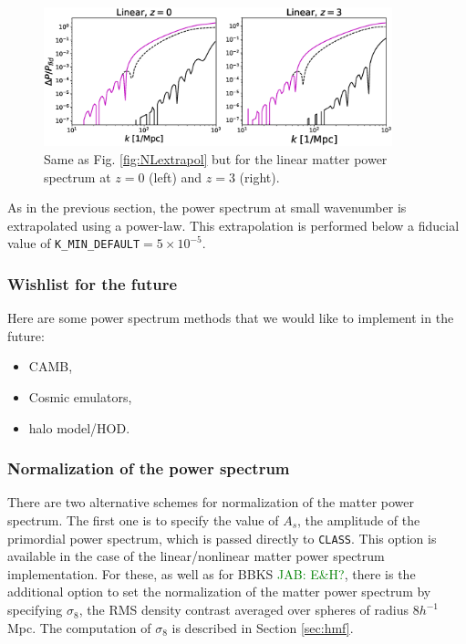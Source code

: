 \documentclass[\docopts]{\docclass}
\newcommand{\jab}[1]{\textcolor{green}{JAB: #1}}
\begin{document}
\begin{figure}
\centering
\includegraphics[width=0.9\textwidth]{PS_converge_lin.eps}
\caption{Same as Fig. \ref{fig:NLextrapol} but for the linear matter power spectrum at $z=0$ (left) and $z=3$ (right).}
\label{fig:Lextrapol}
\end{figure}

As in the previous section, the power spectrum at small wavenumber is extrapolated using a power-law. This extrapolation is performed below a fiducial value of {\tt K\_MIN\_DEFAULT}$=5\times 10^{-5}$.

\subsubsection{Wishlist for the future}
\label{Pk_whishlist}
Here are some power spectrum methods that we would like to implement in the future:
\begin{itemize}
 \item CAMB,
 \item Cosmic emulators,
 \item halo model/HOD.
\end{itemize}


\subsubsection{Normalization of the power spectrum}
\label{sec:PSnorm}

There are two alternative schemes for normalization of the matter power spectrum. The first one is to specify the value of $A_s$, the amplitude of the primordial power spectrum, which is passed directly to {\tt CLASS}. This option is available in the case of the linear/nonlinear matter power spectrum implementation. For these, as well as for BBKS \jab{E\&H?}, there is the additional option to set the normalization of the matter power spectrum by specifying $\sigma_8$, the RMS density contrast averaged over spheres of radius $8h^{-1}$Mpc. The computation of $\sigma_8$ is described in Section \ref{sec:hmf}.
\end{document}

